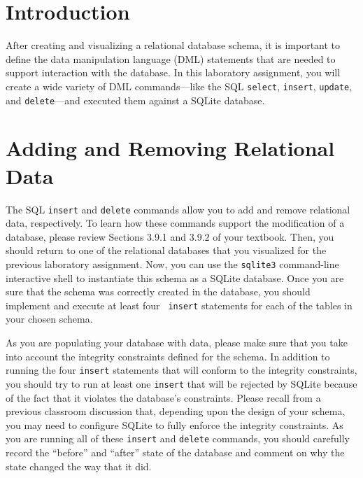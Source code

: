 


\usepackage[compact]{titlesec}



\section*{Introduction}

After creating and visualizing a relational database schema, it is important to define the data manipulation language
(DML) statements that are needed to support interaction with the database.  In this laboratory assignment, you will create
a wide variety of DML commands---like the SQL {\tt select}, {\tt insert}, {\tt update}, and {\tt delete}---and executed
them against a SQLite database.

\vspace*{-.05in}
\section*{Adding and Removing Relational Data}

The SQL {\tt insert} and {\tt delete} commands allow you to add and remove relational data, respectively. To learn how
these commands support the modification of a database, please review Sections 3.9.1 and 3.9.2 of your textbook.  Then,
you should return to one of the relational databases that you visualized for the previous laboratory assignment. Now, you
can use the {\tt sqlite3} command-line interactive shell to instantiate this schema as a SQLite database.
Once you are sure that the schema was correctly created in the database, you should implement and execute at least four {\tt
insert} statements for each of the tables in your chosen schema.  

As you are populating your database with data, please make sure that you take into account the integrity constraints
defined for the schema. In addition to running the four {\tt insert} statements that will conform to the integrity
constraints, you should try to run at least one {\tt insert} that will be rejected by SQLite because of the fact that it
violates the database's constraints. Please recall from a previous classroom discussion that, depending upon the design
of your schema,  you may need to configure SQLite to fully enforce the integrity constraints. As you are running all of
these {\tt insert} and {\tt delete} commands, you should carefully record the ``before'' and ``after'' state of the
database and comment on why the state changed the way that it did. 

